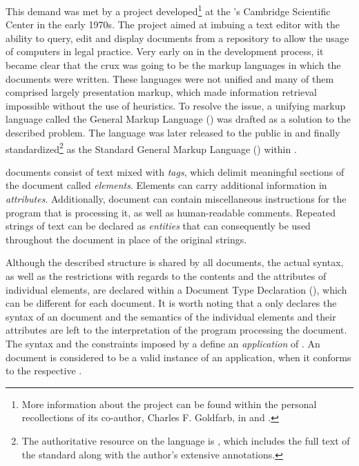 \documentclass{book}
\begin{document}
        This demand was met by a project developed\footnote{
          More information about the project can be found within the personal
          recollections of its co-author, Charles F. Goldfarb, in
          \cite{goldfarb96} and \cite{goldfarb97:whySGML}.
        } at the 's Cambridge Scientific Center in the early 1970s.
        The project aimed at imbuing a text editor with the ability to query,
        edit and display documents from a repository to allow the usage of
        computers in legal practice. Very early on in the development process,
        it became clear that the crux was going to be the markup languages in
        which the documents were written. These languages were not unified and
        many of them comprised largely presentation markup, which made
        information retrieval impossible without the use of heuristics. To
        resolve the issue, a unifying markup language called the General Markup
        Language () was drafted as a solution to the described
        problem. The language was later released to the public in
        \cite{goldfarb81} and finally standardized\footnote{
          The authoritative resource on the  language is
          \cite{goldfarb91}, which includes the full text of the standard along
          with the author's extensive annotations.
        } as the Standard General Markup Language () within
        \cite{iso8879}.

         documents consist of text mixed with \emph{tags}, which
        delimit meaningful sections of the document called \emph{elements}.
        Elements can carry additional information in \emph{attributes}.
        Additionally,  document can contain miscellaneous
        instructions for the program that is processing it, as well as
        human-readable comments. Repeated strings of text can be declared as
        \emph{entities} that can consequently be used throughout the document in
        place of the original strings.
        
        Although the described structure is shared by all 
        documents, the actual syntax, as well as the restrictions with regards
        to the contents and the attributes of individual elements, are declared
        within a Document Type Declaration (), which can be
        different for each document. It is worth noting that a 
        only declares the syntax of an  document and the semantics
        of the individual elements and their attributes are left to the
        interpretation of the program processing the document. The syntax and
        the constraints imposed by a  define an \emph{application}
        of . An  document is considered to be a
        valid instance of an  application, when it conforms to the
        respective .
\end{document}
